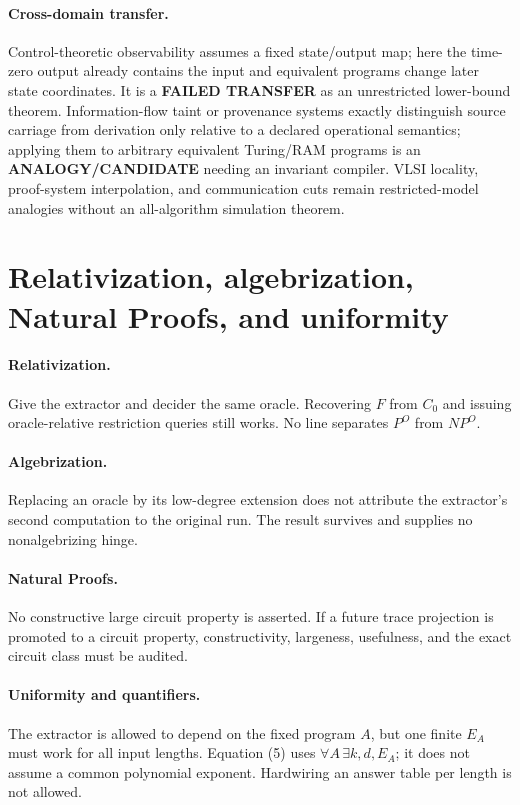 \documentclass[11pt]{article}
\begin{document}
\paragraph{Cross-domain transfer.}
Control-theoretic observability assumes a fixed state/output map; here the
time-zero output already contains the input and equivalent programs change
later state coordinates.  It is a \textbf{FAILED TRANSFER} as an unrestricted
lower-bound theorem.  Information-flow taint or provenance systems exactly
distinguish source carriage from derivation only relative to a declared
operational semantics; applying them to arbitrary equivalent Turing/RAM
programs is an \textbf{ANALOGY/CANDIDATE} needing an invariant compiler.
VLSI locality, proof-system interpolation, and communication cuts remain
restricted-model analogies without an all-algorithm simulation theorem.

\section{Relativization, algebrization, Natural Proofs, and uniformity}
\paragraph{Relativization.}
Give the extractor and decider the same oracle.  Recovering $F$ from $C_0$ and
issuing oracle-relative restriction queries still works.  No line separates
$P^O$ from $NP^O$.

\paragraph{Algebrization.}
Replacing an oracle by its low-degree extension does not attribute the
extractor's second computation to the original run.  The result survives and
supplies no nonalgebrizing hinge.

\paragraph{Natural Proofs.}
No constructive large circuit property is asserted.  If a future trace
projection is promoted to a circuit property, constructivity, largeness,
usefulness, and the exact circuit class must be audited.

\paragraph{Uniformity and quantifiers.}
The extractor is allowed to depend on the fixed program $A$, but one finite
$E_A$ must work for all input lengths.  Equation (5) uses
$\forall A\,\exists k,d,E_A$; it does not assume a common polynomial exponent.
Hardwiring an answer table per length is not allowed.
\end{document}
